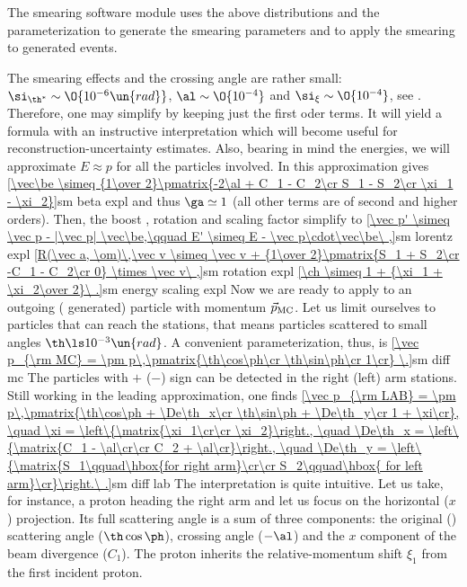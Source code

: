 The smearing software module uses the above distributions and the parameterization  to generate the smearing parameters and  to apply the smearing to  generated events.

The smearing effects and the crossing angle are rather small: $\si_{\th^*} \sim \O{10^{-6}\un{rad}}$, $\al \sim \O{10^{-4}}$ and $\si_\xi \sim \O{10^{-4}}$, see . Therefore, one may simplify  by keeping just the first oder terms. It will yield a formula with an instructive interpretation which will become useful for reconstruction-uncertainty estimates. Also, bearing in mind the  energies, we will approximate $E\approx p$ for all the particles involved. In this approximation  gives
\eqref{\vec\be \simeq {1\over 2}\pmatrix{-2\al + C_1 - C_2\cr S_1 - S_2\cr \xi_1 - \xi_2}}{sm beta expl}
and thus $\ga\simeq 1$ (all other terms are of second and higher orders). Then, the boost , rotation  and scaling factor  simplify to
\eqref{\vec p' \simeq \vec p - |\vec p| \vec\be,\qquad E' \simeq E - \vec p\cdot\vec\be\ ,}{sm lorentz expl}
\eqref{R(\vec a, \om)\,\vec v \simeq \vec v + {1\over 2}\pmatrix{S_1 + S_2\cr -C_1 - C_2\cr 0} \times \vec v\ ,}{sm rotation expl}
\eqref{\ch \simeq 1 + {\xi_1 + \xi_2\over 2}\ .}{sm energy scaling expl}
Now we are ready to apply  to an outgoing ( generated) particle with momentum $\vec p_{\rm MC}$. Let us limit ourselves to particles that can reach the  stations, that means particles scattered to small angles $\th \ls 10^{-3}\un{rad}$. A convenient parameterization, thus, is
\eqref{\vec p_{\rm MC} = \pm p\,\pmatrix{\th\cos\ph\cr \th\sin\ph\cr 1\cr} \.}{sm diff mc}
The particles with $+$ ($-$) sign can be detected in the right (left) arm  stations. Still working in the leading approximation, one finds
\eqref{\vec p_{\rm LAB} = \pm p\,\pmatrix{\th\cos\ph + \De\th_x\cr \th\sin\ph + \De\th_y\cr 1 + \xi\cr},
\quad \xi = \left\{\matrix{\xi_1\cr\cr \xi_2}\right.,
\quad \De\th_x = \left\{\matrix{C_1 - \al\cr\cr C_2 + \al\cr}\right.,
\quad \De\th_y = \left\{\matrix{S_1\qquad\hbox{for right arm}\cr\cr S_2\qquad\hbox{ for left arm}\cr}\right.\ .}{sm diff lab} %
The interpretation is quite intuitive. Let us take, for instance, a proton heading the right arm and let us focus on the horizontal ($x$) projection. Its full scattering angle is a sum of three components: the original () scattering angle ($\th\cos\ph$), crossing angle ($-\al$) and the $x$ component of the beam divergence ($C_1$). The proton inherits the relative-momentum shift $\xi_1$ from the first incident proton.


